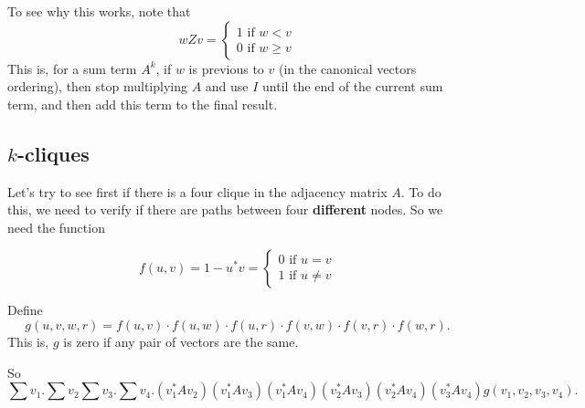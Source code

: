 To see why this works, note that
\[
  			wZv=\begin{cases}
               1 \text{ if } w<v \\
               0 \text{ if } w\geq v
            \end{cases}
		\]
This is, for a sum term $A^k$, if $w$ is previous to $v$ (in the canonical vectors ordering), then stop multiplying $A$ and use $I$ until the end of the current sum term, and then add this term to the final result.

\subsection*{$k$-cliques}

Let's try to see first if there is a four clique in the adjacency matrix $A$. To do this, we need to verify if there are paths between four \textbf{different} nodes. So we need the function 

\[
  			f(u,v)=1-u^*v=\begin{cases}
               0 \text{ if } u=v \\
               1 \text{ if } u\neq v
            \end{cases}
		\]

Define $$g(u,v,w,r)=f(u,v)\cdot f(u,w)\cdot f(u,r)\cdot f(v,w)\cdot f(v,r)\cdot f(w,r).$$ This is, $g$ is zero if any pair of vectors are the same.
		
So $$\sum v_1.\sum v_2 \sum v_3. \sum v_4. (v_1^*Av_2)(v_1^*Av_3)(v_1^*Av_4)(v_2^*Av_3)(v_2^*Av_4)(v_3^*Av_4)g(v_1,v_2,v_3,v_4).$$

